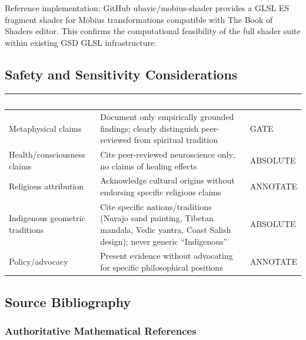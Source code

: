 \documentclass[11pt,letterpaper]{article}
\newcommand{\tableheader}[1]{\textbf{\sffamily\textcolor{white}{#1}}}
\begin{document}
Reference implementation: GitHub ubavic/mobius-shader provides a GLSL ES fragment shader for M\"{o}bius transformations compatible with The Book of Shaders editor. This confirms the computational feasibility of the full shader suite within existing GSD GLSL infrastructure.

\subsection{Safety and Sensitivity Considerations}

\begin{center}
\begin{tabularx}{\textwidth}{L{4cm}XC{2cm}}
\toprule
{}
\tableheader{Consideration} & \tableheader{Guideline} & \tableheader{Type} \\
\midrule
Metaphysical claims & Document only empirically grounded findings; clearly distinguish peer-reviewed from spiritual tradition & GATE \\
Health/consciousness claims & Cite peer-reviewed neuroscience only; no claims of healing effects & ABSOLUTE \\
Religious attribution & Acknowledge cultural origins without endorsing specific religious claims & ANNOTATE \\
Indigenous geometric traditions & Cite specific nations/traditions (Navajo sand painting, Tibetan mandala, Vedic yantra, Coast Salish design); never generic ``Indigenous'' & ABSOLUTE \\
Policy/advocacy & Present evidence without advocating for specific philosophical positions & ANNOTATE \\
\bottomrule
\end{tabularx}
\end{center}

\subsection{Source Bibliography}

\subsubsection{Authoritative Mathematical References}
\end{document}
